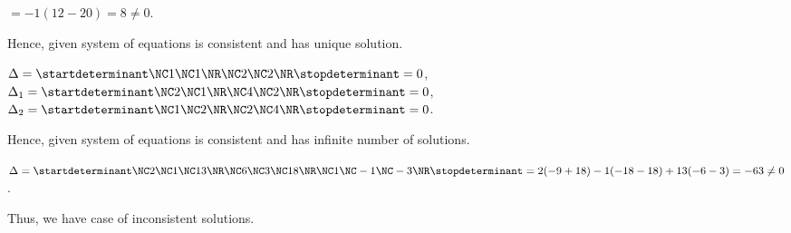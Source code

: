   $= -1(12 - 20) = 8\neq 0$.

  Hence, given system of equations is consistent and has unique solution.
\item $\Delta = \startdeterminant\NC 1 \NC 1\NR\NC 2\NC 2\NR\stopdeterminant = 0$, $\Delta_1
  = \startdeterminant\NC 2\NC 1\NR\NC 4\NC 2\NR\stopdeterminant = 0$, $\Delta_2 = \startdeterminant\NC 1\NC
  2\NR\NC 2\NC 4\NR\stopdeterminant = 0$.

  Hence, given system of equations is consistent and has infinite number of solutions.
\item $\Delta = \startdeterminant\NC 2\NC 1\NC 13\NR\NC 6 \NC 3\NC 18\NR\NC 1\NC -1\NC -3\NR\stopdeterminant
  = 2(-9+ 18) -1(-18 - 18) + 13(-6 - 3) = -63\neq 0$.

  Thus, we have case of inconsistent solutions.
\stopitemize
